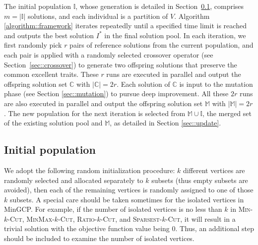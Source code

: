 \documentclass[12pt, a4paper]{article}%
\numberwithin{equation}{section}
\theoremstyle{plain}
\begin{document}
	
	The initial population $\mathbb{I}$, whose generation is detailed in Section~\ref{sec::initial}, comprises $m=|\mathbb{I}|$ solutions, and each individual is a partition of $V$. Algorithm \ref{algorithm::framework} iterates repeatedly until a specified time limit is reached and  outputs the best solution $I^*$ in the final solution pool. In each iteration, we first randomly pick $r$ pairs of reference solutions from the current population, and each pair is applied with a randomly selected crossover operator (see Section~\ref{sec::crossover}) to generate two offspring solutions that preserve the common excellent traits. These $r$ runs are executed in parallel and output the offspring solution set $\mathbb{C}$ with $|\mathbb{C}|=2r$. Each solution of $\mathbb{C}$ is input to the mutation phase (see Section \ref{sec::mutation}) to pursue deep improvement. All these $2r$ runs are also executed in parallel and output the offspring solution set $\mathbb{M}$ with $|\mathbb{M}|=2r$. The new population for the next iteration is selected from $\mathbb{M}\cup\mathbb{I}$, the merged set of the existing solution pool and $\mathbb{M}$, as detailed in Section \ref{sec::update}.
	
	
	
	\subsection{Initial population}
	\label{sec::initial}
	
	We adopt the following random initialization procedure: $k$ different vertices are randomly selected and allocated separately to $k$ subsets (thus empty subsets are avoided), then each of the remaining vertices is randomly assigned to one of those $k$ subsets. A special care should be taken sometimes for the isolated vertices in MinGCP. 
	For example, if the number of isolated vertices is no less than $k$ in \textsc{Min}-$k$-\textsc{Cut}, \textsc{MinMax}-$k$-\textsc{Cut}, \textsc{Ratio}-$k$-\textsc{Cut}, and \textsc{Sparsest}-$k$-\textsc{Cut}, it will result in a trivial solution with the objective function value being $0$. Thus, an additional step should be included to examine the number of isolated vertices.
	
\end{document}
